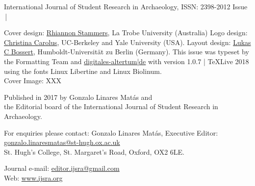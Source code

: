 \IJSRAtitlepage
\clearpage
\mypagesize
\thispagestyle{empty}
\hfill
\vfill

\begin{footnotesize}

\noindent International Journal of Student Research in Archaeology,\newline
ISSN: 2398-2012\newline
Issue \IJSRAnumber\,|\,\IJSRAmonth\ \IJSRAyear
\vspace{2em}


\noindent Cover design: \href{https://latrobe.academia.edu/RhiannonStammers}{Rhiannon Stammers}, La Trobe University (Australia)\newline
\noindent Logo design: \href{https://hraf.yale.edu/about/staff/christina-carolus/}{Christina Carolus}, UC-Berkeley and Yale University (USA).\newline
\noindent Layout design: \href{https://dainst.academia.edu/LukasCBossert}{Lukas C Bossert}, Humboldt-Universität zu Berlin (Germany). \newline \indent This issue was typeset by the Formatting Team and \href{www.digitales-altertum.de}{digitales-altertum|de}  with  version 1.0.7 | \TeX Live 2018 \\ \indent using the fonts Linux Libertine and {\sffamily Linux Biolinum}.\\
Cover Image: 
XXX
\\
\vspace{2em}

\noindent Published in 2017 by Gonzalo Linares Matás and \\ the Editorial board of the International Journal of Student Research in Archaeology. 




\vspace{2em}






\noindent For enquiries please contact: Gonzalo Linares Matás, Executive Editor:\\ \href{mailto:gonzalo.linaresmatas@st-hugh.ox.ac.uk}{gonzalo.linaresmatas@st-hugh.ox.ac.uk}\\  St. Hugh’s College, St. Margaret’s Road, Oxford, OX2 6LE.

\noindent Journal e-mail: \href{mailto:editor.ijsra@gmail.com}{editor.ijsra@gmail.com}\\
\noindent Web: \href{http://www.ijsra.org}{www.ijsra.org}


\end{footnotesize}
